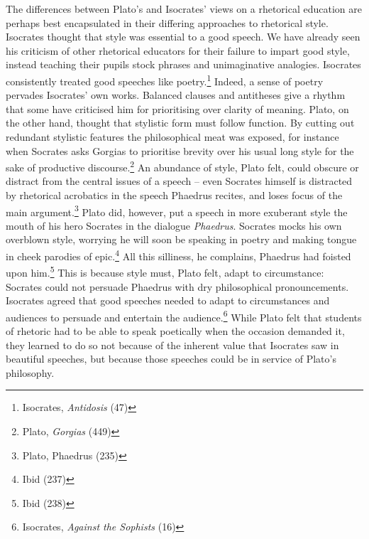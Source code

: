 \begin{multicols}{2}
The differences between Plato's and Isocrates' views on a rhetorical
education are perhaps best encapsulated in their differing approaches to
rhetorical style. Isocrates thought that style was essential to a good
speech. We have already seen his criticism of other rhetorical educators
for their failure to impart good style, instead teaching their pupils
stock phrases and unimaginative analogies. Isocrates consistently
treated good speeches like poetry.\footnote{\textsuperscript{}
	Isocrates, \emph{Antidosis} (47)} Indeed, a sense of poetry pervades
Isocrates' own works. Balanced clauses and antitheses give a rhythm that
some have criticised him for prioritising over clarity of meaning.
Plato, on the other hand, thought that stylistic form must follow
function. By cutting out redundant stylistic features the philosophical
meat was exposed, for instance when Socrates asks Gorgias to prioritise
brevity over his usual long style for the sake of productive
discourse.\footnote{\textsuperscript{} Plato, \emph{Gorgias} (449)} An
abundance of style, Plato felt, could obscure or distract from the
central issues of a speech -- even Socrates himself is distracted by
rhetorical acrobatics in the speech Phaedrus recites, and loses focus of
the main argument.\footnote{\textsuperscript{} Plato, Phaedrus (235)}
Plato did, however, put a speech in more exuberant style the mouth of
his hero Socrates in the dialogue \emph{Phaedrus}. Socrates mocks his
own overblown style, worrying he will soon be speaking in poetry and
making tongue in cheek parodies of epic.\footnote{\textsuperscript{}
	Ibid (237)} All this silliness, he complains, Phaedrus had foisted
upon him.\footnote{\textsuperscript{} Ibid (238)} This is because style
must, Plato felt, adapt to circumstance: Socrates could not persuade
Phaedrus with dry philosophical pronouncements. Isocrates agreed that
good speeches needed to adapt to circumstances and audiences to persuade
and entertain the audience.\footnote{\textsuperscript{} Isocrates,
	\emph{Against the Sophists} (16)} While Plato felt that students of
rhetoric had to be able to speak poetically when the occasion demanded
it, they learned to do so not because of the inherent value that
Isocrates saw in beautiful speeches, but because those speeches could be
in service of Plato's philosophy.


\end{multicols}
